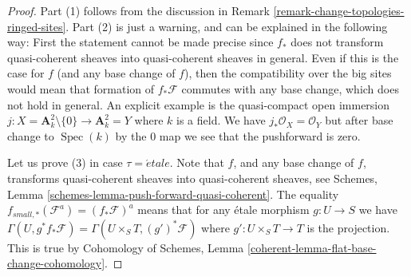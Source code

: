 \documentclass{stacks-project}
\theoremstyle{plain}
\theoremstyle{definition}
\theoremstyle{remark}
\numberwithin{equation}{subsection}
\def\Spec{\mathop{\mathrm{Spec}}}
\def\etale{{\acute{e}tale}}
\begin{document}
\begin{proof}
Part (1) follows from the discussion in
Remark \ref{remark-change-topologies-ringed-sites}.
Part (2) is just a warning, and can be explained in the following way:
First the statement cannot be made precise since $f_*$ does not
transform quasi-coherent sheaves into quasi-coherent sheaves in general.
Even if this is the case for $f$ (and any base change of $f$), then the
compatibility over the big sites would mean that formation of $f_*\mathcal{F}$
commutes with any base change, which does not hold in general.
An explicit example is the quasi-compact open immersion
$j : X = \mathbf{A}^2_k \setminus \{0\} \to \mathbf{A}^2_k = Y$
where $k$ is a field. We have $j_*\mathcal{O}_X = \mathcal{O}_Y$
but after base change to $\Spec(k)$ by the $0$ map
we see that the pushforward is zero.

\medskip\noindent
Let us prove (3) in case $\tau = \etale$. Note that $f$, and any
base change of $f$, transforms quasi-coherent sheaves
into quasi-coherent sheaves, see
Schemes, Lemma \ref{schemes-lemma-push-forward-quasi-coherent}.
The equality $f_{small, *}(\mathcal{F}^a) = (f_*\mathcal{F})^a$
means that for any \'etale morphism $g : U \to S$ we have
$\Gamma(U, g^*f_*\mathcal{F}) = \Gamma(U \times_S T, (g')^*\mathcal{F})$
where $g' : U \times_S T \to T$ is the projection. This is true by
Cohomology of Schemes, Lemma \ref{coherent-lemma-flat-base-change-cohomology}.
\end{proof}
\end{document}

